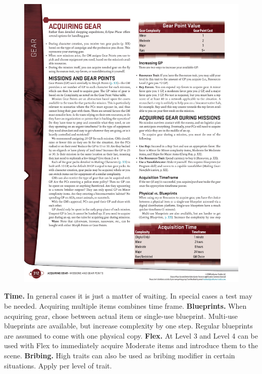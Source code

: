 \begin{figure}[htb!]%
   \centering
   \includegraphics[scale=0.95]{gfx/resources-rep-gearpoints}%
\end{figure}%

\begin{itemize}
    \itembox \textbf{Time.} In general cases it is just a matter of
    waiting. In special cases a  test may be needed. Acquiring multiple items combines time frame.
    \itembox \textbf{Blueprints.} When acquiring gear, chose between actual item or single-use blueprint. Multi-use blueprints are available, but increase complexity by one step. Regular blueprints are assumed to come with one physical copy.
    \itembox \textbf{Flex.} At Level 3 and Level 4 can be used with Flex to immediately
            acquire Moderate items and introduce them to the scene.
    \itembox \textbf{Bribing.} High traits can also be used as bribing modifier in
        certain situations. Apply  per level of trait.
\end{itemize}

